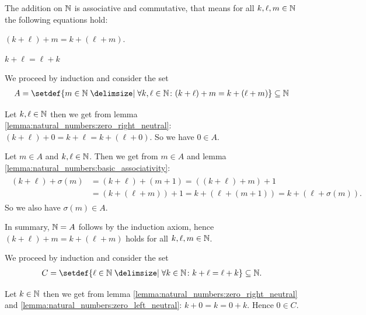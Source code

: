 \begin{theorem}
    The addition on $\mathbb{N}$ is associative and commutative, that means for all $k,\ell,m\in\mathbb{N}$ the following equations hold:
    \begin{intheoremenumerate}
        \item $(k+\ell)+m=k+(\ell+m)$.
        \item $k+\ell=\ell+k$
    \end{intheoremenumerate}
\end{theorem}

\begin{solution}
    \begin{proofenumerate}
        \item We proceed by induction and consider the set
        \begin{align}A=\setdef{m\in\setN\given \forall k,\ell\in\setN\colon (k+\ell)+m=k+(\ell+m)}\subseteq\setN\end{align}

         Let $k,\ell\in\mathbb{N}$ then we get from lemma \ref{lemma:natural_numbers:zero_right_neutral}: $(k+\ell)+0=k+\ell=k+(\ell+0)$.
        So we have $0\in A$.

         Let $m\in A$ and $k,\ell\in\mathbb{N}$. Then we get from $m\in A$ and lemma \ref{lemma:natural_numbers:basic_associativity}:
        \begin{align}\begin{split}
        (k+\ell)+\sigma(m)&=(k+\ell)+(m+1)=((k+\ell)+m)+1\\
            &=(k+(\ell+m))+1=k+(\ell+(m+1))=k+(\ell+\sigma(m)).
        \end{split}\end{align}
        So we also have $\sigma(m)\in A$.

        In summary, $\mathbb{N}=A$ follows by the induction axiom, hence $(k+\ell)+m=k+(\ell+m)$ holds for all $k,\ell,m\in\mathbb{N}$.

        \item We proceed by induction and consider the set
        \begin{align}C=\setdef{\ell\in\setN\given \forall k\in\setN\colon k+\ell=\ell+k}\subseteq\setN.\end{align}

         Let $k\in\mathbb{N}$ then we get from lemma \ref{lemma:natural_numbers:zero_right_neutral} and \ref{lemma:natural_numbers:zero_left_neutral}: $k+0=k=0+k$.
        Hence $0\in C$.


\end{proofenumerate}
\end{solution}
